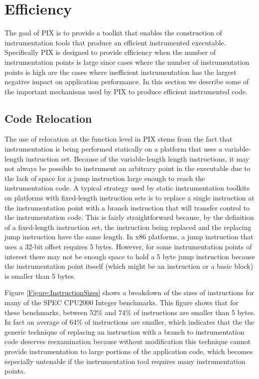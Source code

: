 \section{Efficiency}

The goal of PIX is to provide a toolkit that enables the construction of
instrumentation tools that produce an efficient instrumented
executable. Specifically PIX is designed to provide efficiency when
the number of instrumentation points is large since cases where the number of
instrumentation points is high are the cases where inefficient instrumentation
has the largest negative impact on application performance. 
In this section we describe some of the important mechanisms used by PIX 
to produce efficient instrumented code.

\label{Subsection:Relocation}
\subsection{Code Relocation}
The use of relocation at the function level in PIX stems from the fact
that instrumentation is being performed statically on a platform that uses a
variable-length instruction set. Because of the variable-length length instructions, it may not always be possible to instrument
an arbitrary point in the executable due to the lack of space for a jump instruction large enough to reach the instrumentation code. 
A typical strategy used by static instrumentation toolkits on platforms with fixed-length instruction sets is to
replace a single instruction at the instrumentation point with a
branch instruction that will transfer control to the instrumentation code. This is fairly straightforward because, by the
definition of a fixed-length instruction set, the instruction being replaced and
the replacing jump instruction have the same length. 
In x86 platforms, a jump instruction that uses a 32-bit offset requires 5 bytes. However, for some
instrumentation points of interest there may not be enough space to hold a 5 byte
jump instruction because the instrumentation point itsself (which might be an instruction or a
basic block) is smaller than 5 bytes. 

Figure \ref{Figure:InstructionSizes} shows a breakdown of the sizes of
instructions for many of the SPEC CPU2000 Integer benchmarks. This figure shows that for these benchmarks,
between 52\% and 74\% of instructions are smaller than 5 bytes. In fact an average of 64\% of instructions
are smaller, which indicates that the the generic technique of replacing 
an instruction with a branch to instrumentation code deserves reexamination because without modification
this technique cannot provide instrumentation to large portions of the application code, which becomes
especially untenable if the instrumentation tool requires many instrumentation points.


